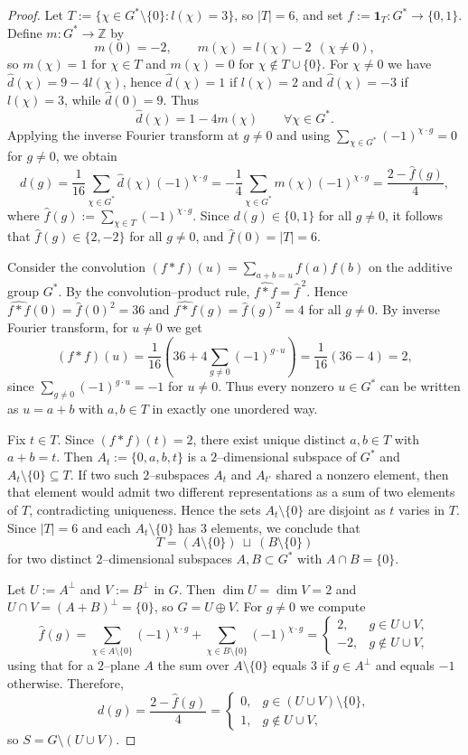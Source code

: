 \documentclass[12pt,twoside,]{amsart}
\theoremstyle{plain}
\theoremstyle{definition}
\begin{document}
\begin{proof}
Let $T:=\{\chi\in G^*\setminus\{0\}: l(\chi)=3\}$, so $|T|=6$, and set
$f:=\mathbf 1_T:G^*\to\{0,1\}$.  Define $m:G^*\to\mathbb Z$ by
\[
m(0)=-2,\qquad m(\chi)=l(\chi)-2\ \ (\chi\ne 0),
\]
so $m(\chi)=1$ for $\chi\in T$ and $m(\chi)=0$ for $\chi\notin T\cup\{0\}$.
For $\chi\ne 0$ we have $\widehat d(\chi)=9-4l(\chi)$, hence $\widehat d(\chi)=1$
if $l(\chi)=2$ and $\widehat d(\chi)=-3$ if $l(\chi)=3$, while $\widehat d(0)=9$.
Thus
\[
\widehat d(\chi)=1-4m(\chi)\qquad\forall \chi\in G^*.
\]
Applying the inverse Fourier transform at $g\ne 0$ and using
$\sum_{\chi\in G^*}(-1)^{\chi\cdot g}=0$ for $g\ne 0$, we obtain
\[
d(g)=\frac1{16}\sum_{\chi\in G^*}\widehat d(\chi)(-1)^{\chi\cdot g}
=-\frac14\sum_{\chi\in G^*}m(\chi)(-1)^{\chi\cdot g}
=\frac{2-\widehat f(g)}{4},
\]
where $\widehat f(g):=\sum_{\chi\in T}(-1)^{\chi\cdot g}$.  Since $d(g)\in\{0,1\}$
for all $g\ne 0$, it follows that $\widehat f(g)\in\{2,-2\}$ for all $g\ne 0$, and
$\widehat f(0)=|T|=6$.

Consider the convolution $(f*f)(u)=\sum_{a+b=u} f(a)f(b)$ on the additive group $G^*$.
By the convolution--product rule, $\widehat{f*f}=\widehat f^{\,2}$.  Hence
$\widehat{f*f}(0)=\widehat f(0)^2=36$ and $\widehat{f*f}(g)=\widehat f(g)^2=4$
for all $g\ne 0$.  By inverse Fourier transform, for $u\ne 0$ we get
\[
(f*f)(u)=\frac1{16}\!\left(36+4\!\sum_{g\ne 0}(-1)^{g\cdot u}\right)
=\frac1{16}(36-4)=2,
\]
since $\sum_{g\ne 0}(-1)^{g\cdot u}=-1$ for $u\ne 0$.  Thus every nonzero
$u\in G^*$ can be written as $u=a+b$ with $a,b\in T$ in exactly one unordered way.

Fix $t\in T$.  Since $(f*f)(t)=2$, there exist unique distinct $a,b\in T$ with $a+b=t$.
Then $A_t:=\{0,a,b,t\}$ is a $2$--dimensional subspace of $G^*$ and $A_t\setminus\{0\}\subseteq T$.
If two such $2$--subspaces $A_t$ and $A_{t'}$ shared a nonzero element, then that element would admit
two different representations as a sum of two elements of $T$, contradicting uniqueness.  Hence the sets
$A_t\setminus\{0\}$ are disjoint as $t$ varies in $T$.  Since $|T|=6$ and each $A_t\setminus\{0\}$ has
$3$ elements, we conclude that
\[
T=(A\setminus\{0\})\ \sqcup\ (B\setminus\{0\})
\]
for two distinct $2$--dimensional subspaces $A,B\subset G^*$ with $A\cap B=\{0\}$.

Let $U:=A^\perp$ and $V:=B^\perp$ in $G$.  Then $\dim U=\dim V=2$ and
$U\cap V=(A+B)^\perp=\{0\}$, so $G=U\oplus V$.  For $g\ne 0$ we compute
\[
\widehat f(g)=\sum_{\chi\in A\setminus\{0\}}(-1)^{\chi\cdot g}
+\sum_{\chi\in B\setminus\{0\}}(-1)^{\chi\cdot g}
=
\begin{cases}
2,& g\in U\cup V,\\
-2,& g\notin U\cup V,
\end{cases}
\]
using that for a $2$--plane $A$ the sum over $A\setminus\{0\}$ equals $3$ if $g\in A^\perp$
and equals $-1$ otherwise.  Therefore,
\[
d(g)=\frac{2-\widehat f(g)}{4}=
\begin{cases}
0,& g\in (U\cup V)\setminus\{0\},\\
1,& g\notin U\cup V,
\end{cases}
\]
so $S=G\setminus(U\cup V)$.


\end{proof}
\end{document}
